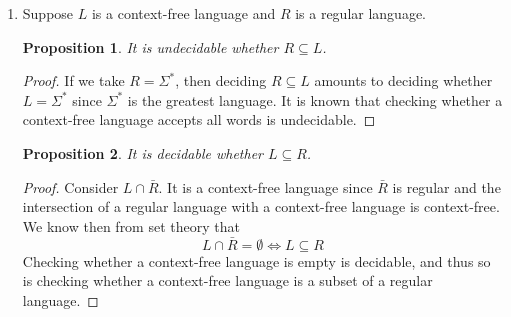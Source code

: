 \documentclass[letterpaper,11pt]{article}
\newtheorem{proposition}{Proposition}
\begin{document}
\begin{enumerate}
    \item
        Suppose $L$ is a context-free language and $R$ is a regular language.

        \begin{proposition}
            It is undecidable whether $R \subseteq L$.
        \end{proposition}

        \begin{proof}
            If we take $R = \Sigma^*$, then deciding $R \subseteq L$ amounts to
            deciding whether $L = \Sigma^*$ since $\Sigma^*$ is the greatest
            language. It is known that checking whether a context-free language
            accepts all words is undecidable.
        \end{proof}

        \begin{proposition}
            It is decidable whether $L \subseteq R$.
        \end{proposition}
        
        \begin{proof}
            Consider $L \cap \bar R$. It is a context-free language since $\bar
            R$ is regular and the intersection of a regular language with a
            context-free language is context-free. We know then from set theory
            that
            $$L \cap \bar R = \emptyset \iff L \subseteq R$$
            Checking whether a context-free language is empty is decidable, and
            thus so is checking whether a context-free language is a subset of
            a regular language.
        \end{proof}
\end{enumerate}
\end{document}
